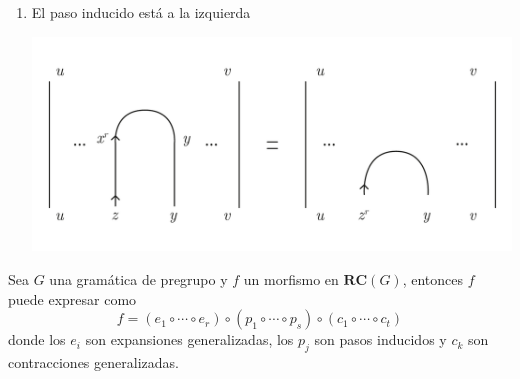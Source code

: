 \documentclass[../main.tex]{subfiles}
\begin{document}
\begin{enumerate}
\begin{enumerate}
\begin{center}
            \end{center}
            \item El paso inducido está a la izquierda
            \begin{center} \includegraphics[scale=.2]{TeX/diagrama/5-13.pdf}
            \end{center}
        \end{enumerate}
        \end{enumerate}

    \begin{thm}
        Sea $G$ una gramática de pregrupo y $f$ un morfismo en $\textbf{RC}(G)$, entonces $f$ puede expresar como
        $$f= (e_1 \circ \cdots \circ e_r) \circ (p_1 \circ \cdots \circ p_s) \circ (c_1 \circ \cdots \circ c_t)$$
        donde los $e_i$ son expansiones generalizadas, los $p_j$ son pasos inducidos y $c_k$ son contracciones generalizadas.
    \end{thm}
\end{document}
